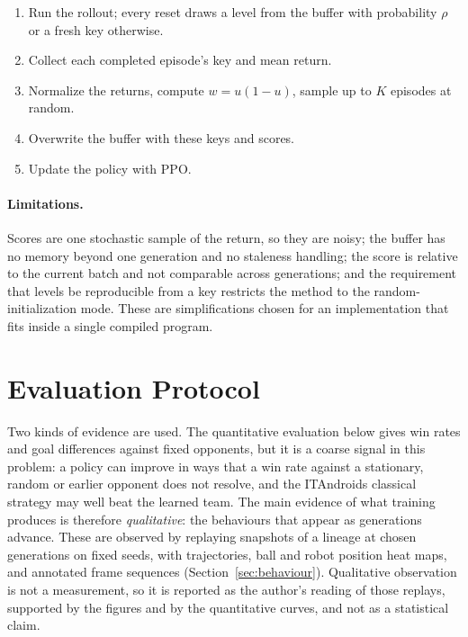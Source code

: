\begin{enumerate}
  \item Run the rollout; every reset draws a level from the buffer with probability $\rho$ or a fresh key otherwise.
  \item Collect each completed episode's key and mean return.
  \item Normalize the returns, compute $w = u(1-u)$, sample up to $K$ episodes at random.
  \item Overwrite the buffer with these keys and scores.
  \item Update the policy with PPO.
\end{enumerate}

\paragraph{Limitations.}
Scores are one stochastic sample of the return, so they are noisy; the buffer has no memory beyond one generation and no staleness handling; the score is relative to the
current batch and not comparable across generations; and the requirement that levels be reproducible from a key restricts the method to the random-initialization mode.  These are
simplifications chosen for an implementation that fits inside a single compiled program.

\section{Evaluation Protocol}
\label{sec:eval_protocol}

Two kinds of evidence are used.  The quantitative evaluation below gives win rates and goal differences against fixed opponents, but it is a coarse signal in this problem: a policy can improve in ways that a win rate against a stationary, random or earlier opponent
does not resolve, and the ITAndroids classical strategy may well beat the learned team.  The main evidence of what training produces is therefore \emph{qualitative}: the behaviours that appear as generations advance.  These are observed by replaying snapshots of a lineage at chosen generations on fixed seeds, with trajectories,
ball and robot position heat maps, and annotated frame sequences (Section~\ref{sec:behaviour}).  Qualitative observation is not a measurement, so it is reported as the author's reading of those replays, supported by the figures and by the quantitative
curves, and not as a statistical claim.

